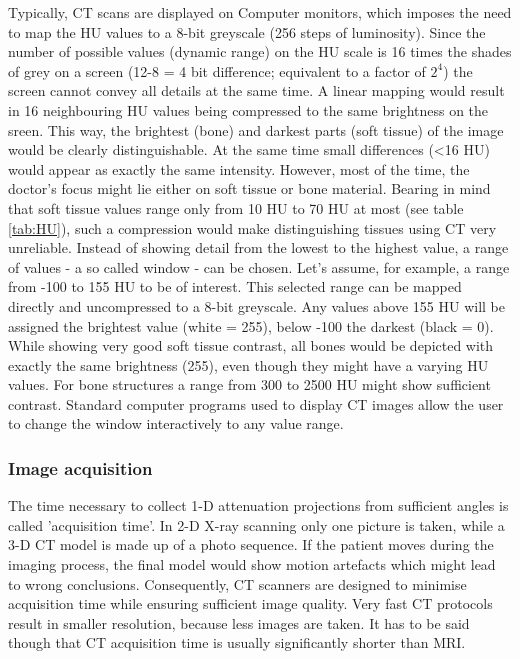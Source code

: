 Typically, CT scans are displayed on Computer monitors, which imposes the need to map the HU values to a 8-bit greyscale (256 steps of luminosity).
Since the number of possible values (dynamic range) on the HU scale is 16 times the shades of grey on a screen (12-8 = 4 bit difference; equivalent to a factor of $2^4$) the screen cannot convey all details at the same time.
A linear mapping would result in 16 neighbouring HU values being compressed to the same brightness on the sreen.
This way, the brightest (bone) and darkest parts (soft tissue) of the image would be clearly distinguishable.
At the same time small differences (<16 HU) would appear as exactly the same intensity.
However, most of the time, the doctor's focus might lie either on soft tissue or bone material.
Bearing in mind that soft tissue values range only from 10 HU to 70 HU at most (see table \ref{tab:HU}), such a compression would make distinguishing tissues using CT very unreliable.
Instead of showing detail from the lowest to the highest value, a range of values - a so called window - can be chosen.
Let's assume, for example, a range from -100 to 155 HU to be of interest.
This selected range can be mapped directly and uncompressed to a 8-bit greyscale.
Any values above 155 HU will be assigned the brightest value (white = 255), below -100 the darkest (black = 0).
While showing very good soft tissue contrast, all bones would be depicted with exactly the same brightness (255), even though they might have a varying HU values.
For bone structures a range from 300 to 2500 HU might show sufficient contrast.
Standard computer programs used to display CT images allow the user to change the window interactively to any value range. \cite{Podgorsak, Maidment2014}

\subsubsection{Image acquisition}
The time necessary to collect 1-D attenuation projections from sufficient angles is called 'acquisition time'.
In 2-D X-ray scanning only one picture is taken, while a 3-D CT model is made up of a photo sequence.
If the patient moves during the imaging process, the final model would show motion artefacts which might lead to wrong conclusions.
Consequently, CT scanners are designed to minimise acquisition time while ensuring sufficient image quality.
Very fast CT protocols result in smaller resolution, because less images are taken.
It has to be said though that CT acquisition time is usually significantly shorter than MRI. \cite{Podgorsak, Maidment2014}


